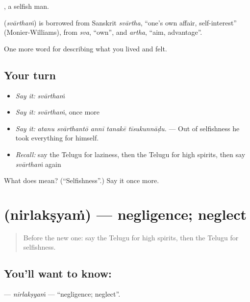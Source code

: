 , a selfish man.

\begin{cousinweb}
\textbf{} (\emph{svārthaṁ}) is borrowed from Sanskrit \emph{svārtha}, \textquotedblleft{}one's own affair, self-interest\textquotedblright{} (Monier-Williams), from \emph{sva}, \textquotedblleft{}own\textquotedblright{}, and \emph{artha}, \textquotedblleft{}aim, advantage\textquotedblright{}.
\end{cousinweb}

\begin{grammarlens}[title={What you've built}]
One more word for describing what you lived and felt.
\end{grammarlens}

\subsection*{Your turn}
\begin{itemize}
\raggedright
  \item \emph{Say it:} \emph{svārthaṁ}
  \item \emph{Say it:} \emph{svārthaṁ}, once more
  \item \emph{Say it:} \emph{atanu svārthantō annī tanakē tīsukunnāḍu.} — Out of selfishness he took everything for himself.
  \item \emph{Recall:} say the Telugu for laziness, then the Telugu for high spirits, then say \emph{svārthaṁ} again
\end{itemize}

\begin{tcolorbox}[breakable,colback=teal!4,colframe=teal!35!black,title={Before you move on}]
What does  mean? (\textquotedblleft{}Selfishness\textquotedblright{}.) Say it once more.
\end{tcolorbox}
\section[\texorpdfstring{\te{నిర్లక్ష్యం} (nirlakṣyaṁ)}{నిర్లక్ష్యం (nirlakṣyaṁ)}]{ (nirlakṣyaṁ) — negligence; neglect}

\label{lesson:TE-C510-nirlaksyam}



\begin{quote}
Before the new one: say the Telugu for high spirits, then the Telugu for selfishness.
\end{quote}

\subsection*{You'll want to know: }
\textbf{} — \emph{nirlakṣyaṁ} — \textquotedblleft{}negligence; neglect\textquotedblright{}.

